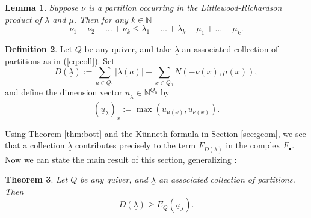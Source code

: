 \documentclass[twoside]{article}
\newcommand{\nat}{\mathbb{N}}
\newcommand{\und}{\underline}
\newtheorem{theorem}{Theorem}[section]
\newtheorem{lemma}[theorem]{Lemma}
\theoremstyle{definition}
\newtheorem{definition}[theorem]{Definition}
\begin{document}
\begin{lemma}
\label{lem:horn}
Suppose $\nu$ is a partition occurring in the Littlewood-Richardson product of $\lambda$ and $\mu$. Then for any $k\in \nat$
$$\nu_1+\nu_2+\dots+\nu_k\leq \lambda_1+\dots+\lambda_k + \mu_1+\dots+\mu_k.$$
\end{lemma}

\vspace{0.1in}

\begin{definition}\label{def:coll} Let $Q$ be any quiver, and take $\underline{\lambda}$ an associated collection of partitions as in (\ref{eq:coll}). Set
$$D(\underline{\lambda}):= \sum_{a\in Q_1} |\lambda(a)|-\sum_{x\in Q_0} N(-\nu(x),\mu(x)),$$
and define the dimension vector $\underline{u}_{\underline{\lambda}}\in \nat^{Q_0}$ by 
$$(\underline{u}_{\underline{\lambda}})_x:=\max(u_{\mu(x)},u_{\nu(x)}).$$
\end{definition}

\vspace{0.1in}

Using Theorem \ref{thm:bott} and the K\"unneth formula in Section \ref{sec:geom}, we see that a collection $\und{\lambda}$ contributes precisely to the term $F_{D(\und{\lambda})}$ in the complex $F_\bullet$. Now we can state the main result of this section, generalizing \cite[Proposition 3.4]{kavita}:

\begin{theorem}\label{thm:main}
Let $Q$ be any quiver, and $\underline{\lambda}$ an associated collection of partitions. Then
$$D(\underline{\lambda})\geq E_Q(\underline{u}_{\underline{\lambda}}).$$
\end{theorem}
\end{document}
